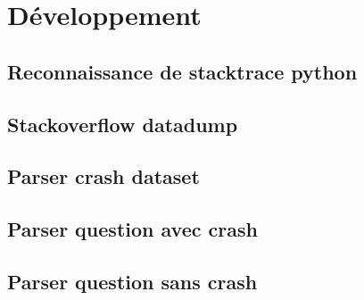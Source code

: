 \section{Développement}
\subsection{Reconnaissance de stacktrace python}
\subsection{Stackoverflow datadump}
\subsection{Parser crash dataset}
\subsection{Parser question avec crash}
\subsection{Parser question sans crash}
